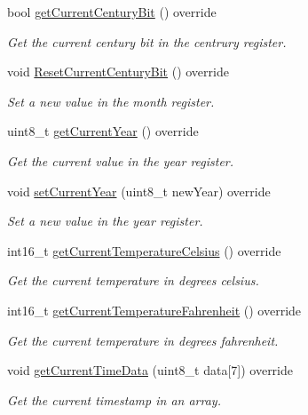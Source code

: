 \begin{DoxyCompactItemize}
bool \mbox{\hyperlink{class_d_s3231_a38dfc1567d3419d5aeecd2062d4121c7}{get\+Current\+Century\+Bit}} () override
\begin{DoxyCompactList}\small\item\em Get the current century bit in the centrury register. \end{DoxyCompactList}\item 
void \mbox{\hyperlink{class_d_s3231_a7559512806e2cc6f68a87ed3e15a53c8}{Reset\+Current\+Century\+Bit}} () override
\begin{DoxyCompactList}\small\item\em Set a new value in the month register. \end{DoxyCompactList}\item 
uint8\+\_\+t \mbox{\hyperlink{class_d_s3231_a28a340b10b045ad1e8b94532a57c3759}{get\+Current\+Year}} () override
\begin{DoxyCompactList}\small\item\em Get the current value in the year register. \end{DoxyCompactList}\item 
void \mbox{\hyperlink{class_d_s3231_a59a60a725581bc8e5dcf857ea52c6281}{set\+Current\+Year}} (uint8\+\_\+t new\+Year) override
\begin{DoxyCompactList}\small\item\em Set a new value in the year register. \end{DoxyCompactList}\item 
int16\+\_\+t \mbox{\hyperlink{class_d_s3231_abd46c1cf5f5c78e3222c3677e70a1272}{get\+Current\+Temperature\+Celsius}} () override
\begin{DoxyCompactList}\small\item\em Get the current temperature in degrees celsius. \end{DoxyCompactList}\item 
int16\+\_\+t \mbox{\hyperlink{class_d_s3231_aa31acb133cc63aa7a2a25eda6244c9df}{get\+Current\+Temperature\+Fahrenheit}} () override
\begin{DoxyCompactList}\small\item\em Get the current temperature in degrees fahrenheit. \end{DoxyCompactList}\item 
void \mbox{\hyperlink{class_d_s3231_a0ca41c2242367c5ff1424d1b12f909c5}{get\+Current\+Time\+Data}} (uint8\+\_\+t data\mbox{[}7\mbox{]}) override
\begin{DoxyCompactList}\small\item\em Get the current timestamp in an array. \end{DoxyCompactList}\item 

\end{DoxyCompactItemize}
